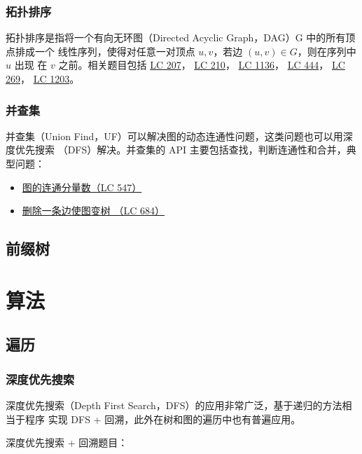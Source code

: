 \subsection{拓扑排序}
拓扑排序是指将一个有向无环图（Directed Acyclic Graph，DAG）G 中的所有顶点排成一个
线性序列，使得对任意一对顶点 $u, v$，若边 $(u, v) \in G$，则在序列中 $u$ 出现
在 $v$ 之前。相关题目包括
\href{https://leetcode.com/problems/course-schedule/}{LC 207}，
\href{https://leetcode.com/problems/course-schedule-ii/}{LC 210}，
\href{https://leetcode.com/problems/parallel-courses}{LC 1136}，
\href{https://leetcode.com/problems/sequence-reconstruction}{LC 444}，
\href{https://leetcode.com/problems/alien-dictionary}{LC 269}，
\href{https://leetcode.com/problems/sort-items-by-groups-respecting-dependencies/}{LC 1203}。

\subsection{并查集}
并查集（Union Find，UF）可以解决图的动态连通性问题，这类问题也可以用深度优先搜索
（DFS）解决。并查集的 API 主要包括查找，判断连通性和合并，典型问题：

\begin{itemize}
  \item 
    \href{https://leetcode.com/problems/friend-circles}{图的连通分量数（LC 547）}
  \item
    \href{https://leetcode.com/problems/redundant-connection}{删除一条边使图变树
      （LC 684）}
\end{itemize}

\section{前缀树}

\chapter{算法}
\section{遍历}
\subsection{深度优先搜索}
深度优先搜索（Depth First Search，DFS）的应用非常广泛，基于递归的方法相当于程序
实现 DFS + 回溯，此外在树和图的遍历中也有普遍应用。

深度优先搜索 + 回溯题目：

